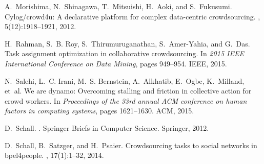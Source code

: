 \documentclass[11pt]{article}
\begin{document}
\begin{thebibliography}{10}
A.~Morishima, N.~Shinagawa, T.~Mitsuishi, H.~Aoki, and S.~Fukusumi.
\newblock Cylog/crowd4u: A declarative platform for complex data-centric
crowdsourcing.
, 5(12):1918--1921, 2012.

H.~Rahman, S.~B. Roy, S.~Thirumuruganathan, S.~Amer-Yahia, and G.~Das.
\newblock Task assignment optimization in collaborative crowdsourcing.
\newblock In {\em 2015 IEEE International Conference on Data Mining}, pages
949--954. IEEE, 2015.

N.~Salehi, L.~C. Irani, M.~S. Bernstein, A.~Alkhatib, E.~Ogbe, K.~Milland,
et~al.
\newblock We are dynamo: Overcoming stalling and friction in collective action
for crowd workers.
\newblock In {\em Proceedings of the 33rd annual ACM conference on human
	factors in computing systems}, pages 1621--1630. ACM, 2015.

D.~Schall.
.
\newblock Springer Briefs in Computer Science. Springer, 2012.

D.~Schall, B.~Satzger, and H.~Psaier.
\newblock Crowdsourcing tasks to social networks in bpel4people.
, 17(1):1--32, 2014.

\end{thebibliography}
\end{document}
